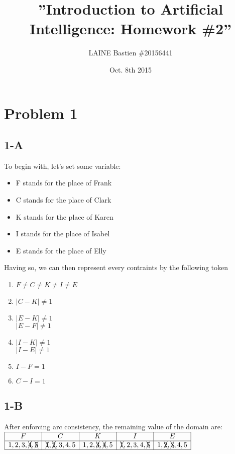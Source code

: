 \documentclass{article}
\begin{document}
    \title{\textbf{''Introduction to Artificial Intelligence: Homework \#2''}}
    \author{LAINE Bastien \#20156441}
    \date{Oct. 8th 2015}
    \maketitle
    \tableofcontents

    \newpage

    \section{Problem 1}
        \subsection{1-A}
            To begin with, let's set some variable:
            \begin{itemize}
                \item F stands for the place of Frank
                \item C stands for the place of Clark
                \item K stands for the place of Karen
                \item I stands for the place of Isabel
                \item E stands for the place of Elly
            \end{itemize}
            Having so, we can then represent every contraints by the following token
            \begin{enumerate}
                \item $F\ne C\ne K\ne I\ne E$
                \item $|C-K|\ne 1$
                \item $|E-K|\ne 1$\\
                    $|E-F|\ne 1$
                \item $|I-K|\ne 1$\\
                    $|I-E|\ne 1$
                \item $I-F=1$
                \item $C-I=1$
            \end{enumerate}
        \subsection{1-B}
            After enforcing arc consistency, the remaining value of the domain are:\\
            $\begin{array}{|c|c|c|c|c|}
                \hline
                F&C&K&I&E\\
                \hline
                1,2,3,\xcancel{4},\xcancel{5}&\xcancel{1},\xcancel{2},3,4,5&1,2,\xcancel{3},\xcancel{4},5&\xcancel{1},2,3,4,\xcancel{5}&1,\xcancel{2},\xcancel{3},4,5\\
                \hline
            \end{array}$
\end{document}
